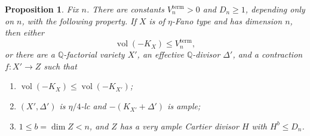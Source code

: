 \documentclass[11pt,reqno]{amsart}
\numberwithin{equation}{section}
\newtheorem{proposition}[theorem]{Proposition}
\theoremstyle{definition}
\theoremstyle{remark}
\newcommand{\Q}{\mathbb Q}
\newcommand{\vol}{\operatorname{vol}}
\begin{document}
\begin{proposition}\label{prop:boundedbase}
Fix $n$. There are constants $V_n^{\mathrm{term}}>0$ and $D_n\ge1$, depending only on $n$, with the following property. If $X$ is of $\eta$-Fano type and has dimension $n$, then either
\[
 \vol(-K_X)\le V_n^{\mathrm{term}},
\]
or there are a $\Q$-factorial variety $X'$, an effective $\Q$-divisor $\Delta'$, and a contraction $f:X'\to Z$ such that
\begin{enumerate}
\item $\vol(-K_X)\le\vol(-K_{X'})$;
\item $(X',\Delta')$ is $\eta/4$-lc and $-(K_{X'}+\Delta')$ is ample;
\item $1\le b=\dim Z<n$, and $Z$ has a very ample Cartier divisor $H$ with $H^b\le D_n$.
\end{enumerate}
\end{proposition}
\end{document}
